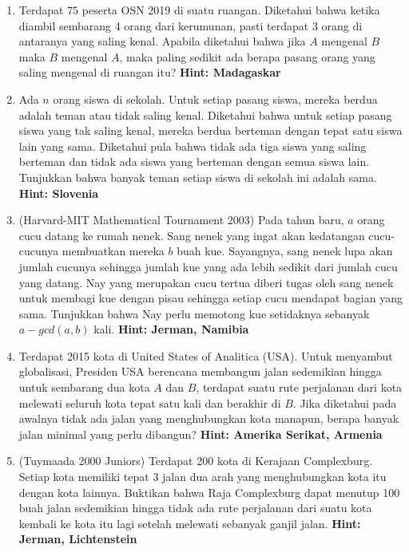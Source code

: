 \documentclass[11pt]{scrartcl}
\begin{document}
\begin{enumerate}
    \item Terdapat $75$ peserta OSN 2019 di suatu ruangan. Diketahui bahwa ketika diambil sembarang 4 orang dari kerumunan, pasti terdapat 3 orang di antaranya yang saling kenal. Apabila diketahui bahwa jika $A$ mengenal $B$ maka $B$ mengenal $A$, maka paling sedikit ada berapa pasang orang yang saling mengenal di ruangan itu? \textbf{Hint: Madagaskar}
    \item Ada $n$ orang siswa di sekolah. Untuk setiap pasang siswa, mereka berdua adalah teman atau tidak saling kenal. Diketahui bahwa untuk setiap pasang siswa yang tak saling kenal, mereka berdua berteman dengan tepat satu siswa lain yang sama. Diketahui pula bahwa tidak ada tiga siswa yang saling berteman dan tidak ada siswa yang berteman dengan semua siswa lain. Tunjukkan bahwa banyak teman setiap siswa di sekolah ini adalah sama. \textbf{Hint: Slovenia}
    \item (Harvard-MIT Mathematical Tournament 2003) Pada tahun baru, $a$ orang cucu datang ke rumah nenek. Sang nenek yang ingat akan kedatangan cucu-cucunya membuatkan mereka $b$ buah kue. Sayangnya, sang nenek lupa akan jumlah cucunya sehingga jumlah kue yang ada lebih sedikit dari jumlah cucu yang datang. Nay yang merupakan cucu tertua diberi tugas oleh sang nenek untuk membagi kue dengan pisau sehingga setiap cucu mendapat bagian yang sama. Tunjukkan bahwa Nay perlu memotong kue setidaknya sebanyak $a - gcd(a,b)$ kali. \textbf{Hint: Jerman, Namibia}
    \item Terdapat 2015 kota di United States of Analitica (USA). Untuk menyambut globalisasi, Presiden USA berencana membangun jalan sedemikian hingga untuk sembarang dua kota $A$ dan $B$, terdapat suatu rute perjalanan dari kota melewati seluruh kota tepat satu kali dan berakhir di $B$. Jika diketahui pada awalnya tidak ada jalan yang menghubungkan kota manapun, berapa banyak jalan minimal yang perlu dibangun? \textbf{Hint: Amerika Serikat, Armenia}
    \item (Tuymaada 2000 Juniors) Terdapat 200 kota di Kerajaan Complexburg. Setiap kota memiliki tepat 3 jalan dua arah yang menghubungkan kota itu dengan kota lainnya. Buktikan bahwa Raja Complexburg dapat menutup 100 buah jalan sedemikian hingga tidak ada rute perjalanan dari suatu kota kembali ke kota itu lagi setelah melewati sebanyak ganjil jalan. \textbf{Hint: Jerman, Lichtenstein}

\end{enumerate}
\end{document}
